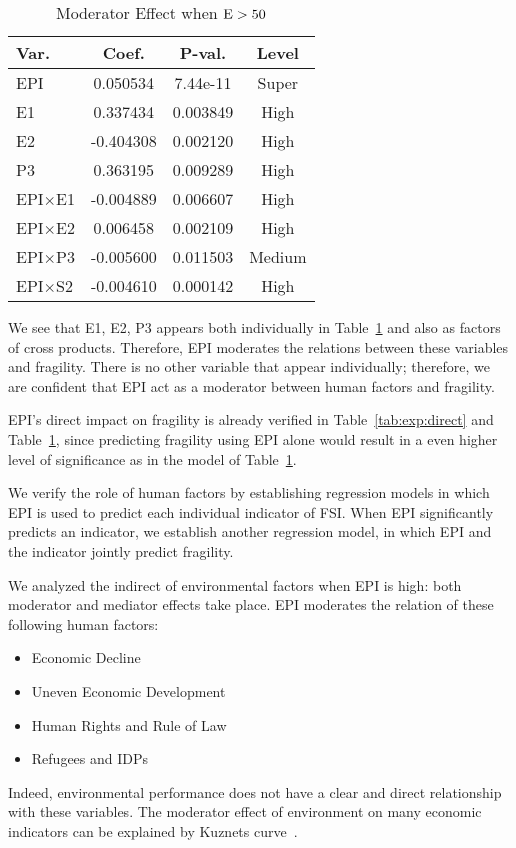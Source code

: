 \begin{table}[htbp]
    \centering
   \begin{tabular}{|l|ccc|}\hline
      Var. & Coef. & P-val. & Level \\ \hline
      EPI & 0.050534 & 7.44e-11 & Super \\ \hline
      E1 & 0.337434 & 0.003849 & High \\ \hline
      E2 & -0.404308 & 0.002120 & High \\ \hline
      P3 & 0.363195 & 0.009289 & High \\ \hline
      EPI$\times$E1 & -0.004889 & 0.006607 & High \\ \hline
      EPI$\times$E2 & 0.006458 & 0.002109 & High \\ \hline
      EPI$\times$P3 & -0.005600 & 0.011503 & Medium \\ \hline
      EPI$\times$S2 & -0.004610 & 0.000142 & High \\ \hline
   \end{tabular} 
   \caption{Moderator Effect when $\operatorname*{E} > 50$}
   \label{tab:exp:indirect:moderator:case1}
\end{table}

We see that E1, E2, P3 appears both individually in Table~\ref{tab:exp:indirect:moderator:case1} and also as factors of cross products. Therefore, EPI moderates the relations between these variables and fragility. There is no other variable that appear individually; therefore, we are confident that EPI act as a moderator between human factors and fragility.

EPI's direct impact on fragility is already verified in Table~\ref{tab:exp:direct} and Table~\ref{tab:exp:indirect:moderator:case1}, since predicting fragility using EPI alone would result in a even higher level of significance as in the model of Table~\ref{tab:exp:indirect:moderator:case1}.

We verify the role of human factors by establishing regression models in which EPI is used to predict each individual indicator of FSI. When EPI significantly predicts an indicator, we establish another regression model, in which EPI and the indicator jointly predict fragility. 

We analyzed the indirect of environmental factors when EPI is high: both moderator and mediator effects take place. EPI moderates the relation of these following human factors:
\begin{itemize}
    \item Economic Decline
    \item Uneven Economic Development
    \item Human Rights and Rule of Law
    \item Refugees and IDPs 
\end{itemize}
Indeed, environmental performance does not have a clear and direct relationship with these variables. The moderator effect of environment on many economic indicators can be explained by Kuznets curve~.

